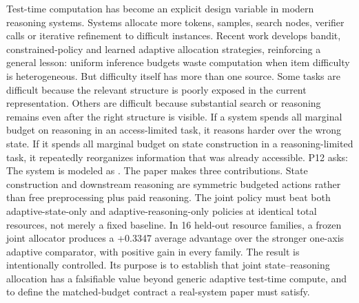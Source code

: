 \markdownRendererDocumentBegin
\markdownRendererSectionBegin
{}\markdownRendererInterblockSeparator
{}Test-time computation has become an explicit design variable in modern reasoning systems. Systems allocate more tokens, samples, search nodes, verifier calls or iterative refinement to difficult instances. Recent work develops bandit, constrained-policy and learned adaptive allocation strategies, reinforcing a general lesson: uniform inference budgets waste computation when item difficulty is heterogeneous.\markdownRendererInterblockSeparator
{}But difficulty itself has more than one source. Some tasks are difficult because the relevant structure is poorly exposed in the current representation. Others are difficult because substantial search or reasoning remains even after the right structure is visible. If a system spends all marginal budget on reasoning in an access-limited task, it reasons harder over the wrong state. If it spends all marginal budget on state construction in a reasoning-limited task, it repeatedly reorganizes information that was already accessible.\markdownRendererInterblockSeparator
{}P12 asks:\markdownRendererInterblockSeparator
{}\markdownRendererBlockQuoteBegin
{}
\markdownRendererBlockQuoteEnd \markdownRendererInterblockSeparator
{}The system is modeled as\markdownRendererInterblockSeparator
{}.\markdownRendererInterblockSeparator
{}The paper makes three contributions.\markdownRendererInterblockSeparator
{}\markdownRendererOlBeginTight
{} State construction and downstream reasoning are symmetric budgeted actions rather than free preprocessing plus paid reasoning.\markdownRendererOlItemEnd 
{} The joint policy must beat both adaptive-state-only and adaptive-reasoning-only policies at identical total resources, not merely a fixed baseline.\markdownRendererOlItemEnd 
{} In 16 held-out resource families, a frozen joint allocator produces a +0.3347 average advantage over the stronger one-axis adaptive comparator, with positive gain in every family.\markdownRendererOlItemEnd 
\markdownRendererOlEndTight \markdownRendererInterblockSeparator
{}The result is intentionally controlled. Its purpose is to establish that joint state–reasoning allocation has a falsifiable value beyond generic adaptive test-time compute, and to define the matched-budget contract a real-system paper must satisfy.
\markdownRendererSectionEnd \markdownRendererDocumentEnd